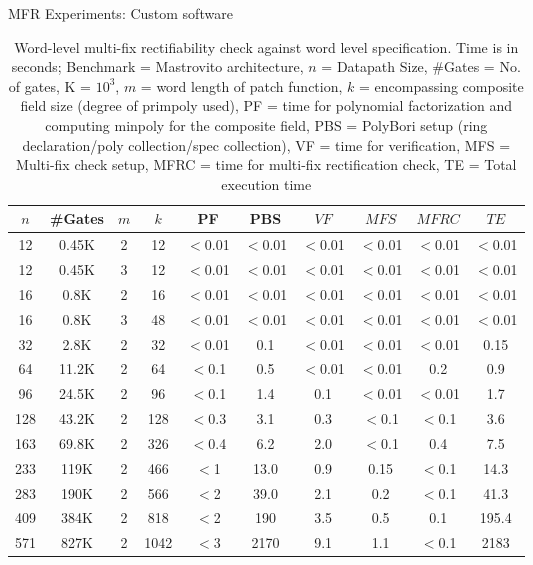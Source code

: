 \begin{frame}{\large MFR Experiments: Custom software}

{\tiny
\begin{table}[]
\centering
\caption{{\footnotesize Word-level multi-fix rectifiability check against word level specification. Time is in seconds; Benchmark = Mastrovito architecture, $n$ = Datapath Size, \#Gates = No. of gates, K = $10^3$, $m$ = word length of patch function, $k$ = encompassing composite field size (degree of primpoly used), PF = time for polynomial factorization and computing minpoly for the composite field, PBS = PolyBori setup (ring declaration/poly collection/spec collection), VF = time for verification, MFS = Multi-fix check setup, MFRC = time for multi-fix rectification check, TE = Total execution time}}
\label{mavsspec}
\begin{tabular}{| c | c | c | c | c | c | c | c | c | c |} \hline
{\textbf{$n$}} & {\textbf{\#Gates}} & {\textbf{$m$}} & {\textbf{$k$}} & {\textbf{PF}} & {\textbf{PBS}} & {\textbf{$VF$}} & {\textbf{$MFS$}} & {\textbf{$MFRC$}} & {\textbf{$TE$}}\\ \hline 
12   & 0.45K & 2 & 12   & $<$0.01 & $<$0.01 & $<$0.01  & $<$0.01 & $<$0.01 & $<$0.01  \\ \hline
12   & 0.45K & 3 & 12   & $<$0.01 & $<$0.01 & $<$0.01  & $<$0.01 & $<$0.01 & $<$0.01  \\ \hline
16   & 0.8K  & 2 & 16   & $<$0.01 & $<$0.01 & $<$0.01  & $<$0.01 & $<$0.01 & $<$0.01  \\ \hline
16 	 & 0.8K  & 3 & 48   & $<$0.01 & $<$0.01 & $<$0.01  & $<$0.01 & $<$0.01 & $<$0.01  \\ \hline
32   & 2.8K  & 2 & 32   & $<$0.01 & 0.1     & $<$0.01  & $<$0.01 & $<$0.01 & 0.15     \\ \hline
64   & 11.2K & 2 & 64   & $<$0.1  & 0.5     & $<$0.01  & $<$0.01 & 0.2     & 0.9      \\ \hline
96   & 24.5K & 2 & 96   & $<$0.1  & 1.4     & 0.1      & $<$0.01 & $<$0.01 & 1.7      \\ \hline
128  & 43.2K & 2 & 128  & $<$0.3  & 3.1     & 0.3      & $<$0.1  & $<$0.1  & 3.6      \\ \hline
163  & 69.8K & 2 & 326  & $<$0.4  & 6.2     & 2.0      & $<$0.1  & 0.4     & 7.5      \\ \hline
233  & 119K  & 2 & 466  & $<$1    & 13.0    & 0.9      & 0.15    & $<$0.1  & 14.3     \\ \hline
283  & 190K  & 2 & 566  & $<$2    & 39.0    & 2.1      & 0.2     & $<$0.1  & 41.3     \\ \hline
409  & 384K  & 2 & 818  & $<$2    & 190     & 3.5      & 0.5     & 0.1     & 195.4    \\ \hline
571  & 827K  & 2 & 1042 & $<$3    & 2170    & 9.1      & 1.1     & $<$0.1  & 2183     \\ \hline


\end{tabular}
\end{table}}
\end{frame}
